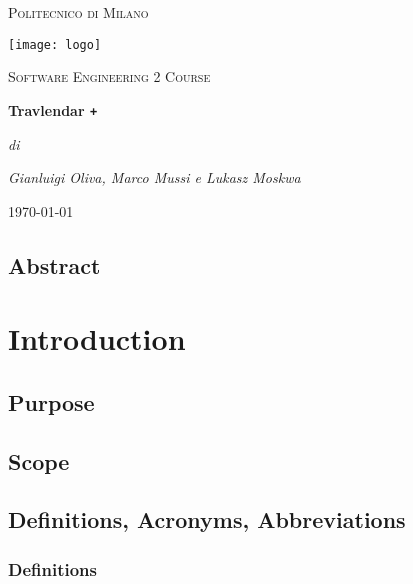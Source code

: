 \documentclass[numbers=noenddot, 12pt, a4paper, oneside]{scrbook}
\def\Plus{\texttt{+}}
\begin{document}
 
\begin{titlepage}
	\centering
	{\scshape\LARGE Politecnico di Milano \par}
	\vspace{1cm}
	\texttt{[image: logo]}\par
	\vspace{1cm}
		
	{\scshape\Large Software Engineering 2 Course\par}
	\vspace{1.5cm}
	{\huge\bfseries Travlendar \Plus \par}
	\vspace{6cm}
	{\Large\itshape di\par}
	{\Large\itshape Gianluigi Oliva, Marco Mussi e Lukasz Moskwa\par}
	\vfill

	
	\vfill
	
	{\large \today\par}
\end{titlepage}

\newpage 
\tableofcontents
\newpage 

\section*{Abstract}


\chapter{Introduction}



\section{Purpose}



\section{Scope}




\section{Definitions, Acronyms, Abbreviations}

\subsection*{Definitions}
\end{document}
